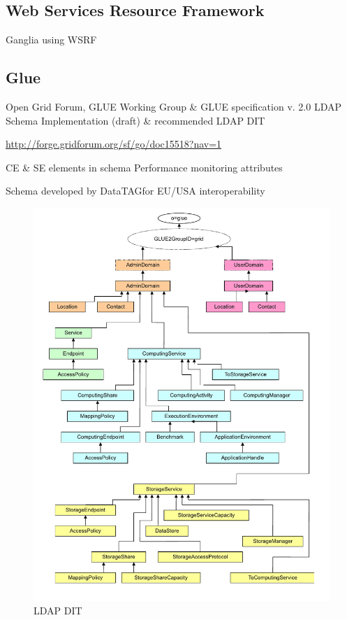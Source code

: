 \subsection{Web Services Resource Framework}
Ganglia using WSRF \cite{gangliaWSRF}

\subsection{Glue}
Open Grid Forum, GLUE Working Group \& GLUE specification v. 2.0
LDAP Schema Implementation (draft) \& recommended LDAP DIT

\url{http://forge.gridforum.org/sf/go/doc15518?nav=1}

CE \& SE elements in schema
Performance monitoring attributes

Schema developed by DataTAGfor EU/USA interoperability


\begin{figure}[htb]
\centering
 \includegraphics[width=6in]{images/glue2.pdf}
\caption{LDAP DIT}
\label{figure:gluedit}
\end{figure}

